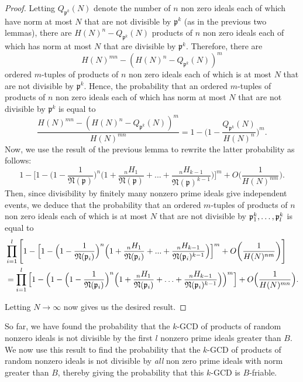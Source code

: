\documentclass[10pt,a4paper]{article}
\theoremstyle{definition}
\theoremstyle{remark}
\newcommand{\f}[1]{\mathfrak{#1}}
\begin{document}
\begin{proof}
	Letting $Q_{\f{p}^k}(N)$ denote the number of $n$ non zero ideals each of which have norm at most $N$ that are not divisible by $\f{p}^k$ (as in the previous two lemmas), there are $H(N)^n - Q_{\f{p}^k}(N)$ products of $n$ non zero ideals each of which has norm at most $N$ that are divisible by $\f{p}^k$. Therefore, there are 
	$$H(N)^{mn} - (H(N)^n - Q_{\f{p}^k}(N))^m$$
	ordered $m$-tuples of products of $n$ non zero ideals each of which is at most $N$ that are not divisible by $\f{p}^k$.
	Hence, the probability that an ordered $m$-tuples of products of $n$ non zero ideals each of which has norm at most $N$ that are not divisible by $\f{p}^k$ is equal to
	$$\frac{H(N)^{mn} - (H(N)^n - Q_{\f{p}^k}(N))^m}{H(N)^{mn}} = 1 - \Big(1 - \frac{Q_{\f{p}^k}(N)}{H(N)^n}\Big)^m.$$
	Now, we use the result of the previous lemma to rewrite the latter probability as follows:
	$$1 - \Big[1 - \Big(1 - \frac{1}{\f{N}(\f{p})}\Big)^n \Big(1 + \frac{{}_nH_1}{\f{N}(\f{p})} + ... + \frac{{}_nH_{k-1}}{\f{N}(\f{p})^{k-1}}\Big)\Big]^m+O\bigg(\frac{1}{H(N)^{nm}}\bigg).$$
	Then, since divisibility by finitely many nonzero prime ideals give independent events, we deduce that the probability that an ordered $m$-tuples of products of $n$ non zero ideals each of which is at most $N$ that are not divisible by $\f{p}_1^k,\mathellipsis,\f{p}_l^k$ is equal to
	\begin{align*} &\prod_{i=1}^l \Bigg[1 - \Big[1 - \Big(1 - \frac{1}{\f{N}(\f{p}_i)}\Big)^n \Big(1 + \frac{{}_nH_1}{\f{N}(\f{p}_i)} + ... + \frac{{}_nH_{k-1}}{\f{N}(\f{p}_i)^{k-1}}\Big)\Big]^m + O\bigg(\frac{1}{H(N)^{nm}}\bigg) \Bigg]\\
		&=\prod_{i=1}^l \Big[1 - \Big(1 -\Big(1-\frac{1}{\f{N}(\f{p}_i)}\Big)^n\Big(1+\frac{{}_nH_1}{\f{N}(\f{p}_i)}+\mathellipsis+\frac{{}_nH_{k-1}}{\f{N}(\f{p}_i)^{k-1}}\Big)\Big)^m\Big] + O\Big(\frac{1}{H(N)^{mn}}\Big). \end{align*}
	
	\noindent Letting $N \to \infty$ now gives us the desired result.
\end{proof}

So far, we have found the probability that the $k$-GCD of products of random nonzero ideals is not divisible by the first \(l\) nonzero prime ideals greater than \(B\). We now use this result to find the probability that the $k$-GCD of products of random nonzero ideals is not divisible by \textit{all} non zero prime ideals with norm greater than $B$, thereby giving the probability that this $k$-GCD is $B$-friable.


\printbibliography
\end{document}
